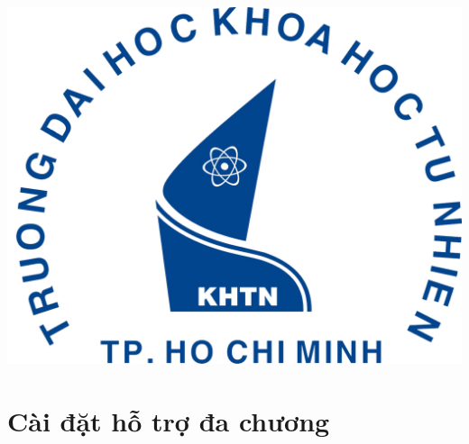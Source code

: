 \begin{titlepage}




\includegraphics{image/logo/logo-hcmus.png}\\[1cm] %
 

\vfill %

\end{titlepage}

\renewcommand*\contentsname{Mục lục}
\tableofcontents
\vfill


\section{Cài đặt hỗ trợ đa chương}

